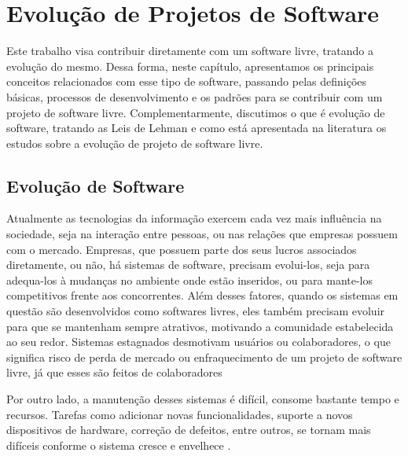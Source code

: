 \chapter{Evolução de Projetos de Software}

Este trabalho visa contribuir diretamente com um software livre, tratando a evolução do mesmo. Dessa forma, neste capítulo, apresentamos os principais conceitos relacionados com esse tipo de software, passando pelas definições básicas, processos de desenvolvimento e os padrões para se contribuir com um projeto de software livre. Complementarmente, discutimos o que é evolução de software, tratando as Leis de Lehman e como está apresentada na literatura os estudos sobre a evolução de projeto de software livre.





\section{Evolução de Software}

Atualmente as tecnologias da informação exercem cada vez mais influência na sociedade, seja na interação entre pessoas, ou nas relações que empresas possuem com o mercado. Empresas, que possuem parte dos seus lucros associados diretamente, ou não, há sistemas de software, precisam evolui-los, seja para adequa-los à mudanças no ambiente onde estão inseridos, ou para mante-los competitivos frente aos concorrentes. Além desses fatores, quando os sistemas em questão são desenvolvidos como softwares livres, eles também precisam evoluir para que se mantenham sempre atrativos, motivando a comunidade estabelecida ao seu redor. Sistemas estagnados desmotivam usuários ou colaboradores, o que significa risco de perda de mercado ou enfraquecimento de um projeto de software livre, já que esses são feitos de colaboradores

Por outro lado, a manutenção desses sistemas é difícil, consome bastante tempo e recursos. Tarefas como adicionar novas funcionalidades, suporte a novos dispositivos de hardware, correção de defeitos, entre outros, se tornam mais difíceis conforme o sistema cresce e envelhece \cite{godfrey2000evolution}.

